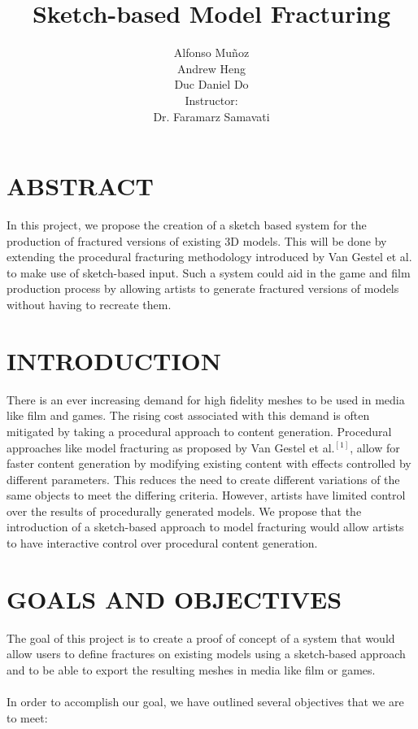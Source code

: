 \documentclass[titlepage, 11pt]{article}
\begin{document}
\title{Sketch-based Model Fracturing}
\author{
Alfonso Mu\~{n}oz\\
Andrew Heng\\
Duc Daniel Do\\
[1cm]{\small Instructor:}\\
\small{Dr. Faramarz Samavati}
}
\maketitle

\section{ABSTRACT}
In this project, we propose the creation of a sketch based system for the production of fractured versions of existing 3D models. This will be done by extending the procedural fracturing methodology introduced by Van Gestel et al. to make use of sketch-based input. Such a system could aid in the game and film production process by allowing artists to generate fractured versions of models without having to recreate them.

\section{INTRODUCTION}
There is an ever increasing demand for high fidelity meshes to be used in media like film and games. The rising cost associated with this demand is often mitigated by taking a procedural approach to content generation. Procedural approaches like model fracturing as proposed by Van Gestel et al.$^{[1]}$, allow for faster content generation by modifying existing content with effects controlled by different parameters. This reduces the need to create different variations of the same objects to meet the differing criteria. However, artists have limited control over the results of procedurally generated models. We propose that the introduction of a sketch-based approach to model fracturing would allow artists to have interactive control over procedural content generation.

\section{GOALS AND OBJECTIVES}
The goal of this project is to create a proof of concept of a system that would allow users to define fractures on existing models using a sketch-based approach and to be able to export the resulting meshes in media like film or games.\\
\\In order to accomplish our goal, we have outlined several objectives that we are to meet:
\end{document}
